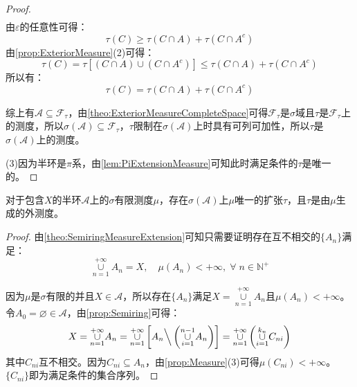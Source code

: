 \begin{proof}
\begin{align*}
	\end{align*}
	由$\varepsilon$的任意性可得：
	\begin{equation*}
		\tau(C)\geqslant\tau(C\cap A)+\tau(C\cap A^c)
	\end{equation*}
	由\cref{prop:ExteriorMeasure}(2)可得：
	\begin{equation*}
		\tau(C)=\tau[(C\cap A)\cup(C\cap A^c)]\leqslant\tau(C\cap A)+\tau(C\cap A^c)
	\end{equation*}
	所以有：
	\begin{equation*}
		\tau(C)=\tau(C\cap A)+\tau(C\cap A^c)
	\end{equation*}\par
	综上有$\mathscr{A}\subseteq\mathscr{F}_\tau$，由\cref{theo:ExteriorMeasureCompleteSpace}可得$\mathscr{F}_\tau$是$\sigma$域且$\tau$是$\mathscr{F}_\tau$上的测度，所以$\sigma(\mathscr{A})\subseteq\mathscr{F}_\tau$，$\tau$限制在$\sigma(\mathscr{A})$上时具有可列可加性，所以$\tau$是$\sigma(\mathscr{A})$上的测度。\par
	(3)因为半环是$\pi$系，由\cref{lem:PiExtensionMeasure}可知此时满足条件的$\tau$是唯一的。
\end{proof}
\begin{corollary}\label{cor:SemiringMeasureExtension}
	对于包含$X$的半环$\mathscr{A}$上的$\sigma$有限测度$\mu$，存在$\sigma(\mathscr{A})$上$\mu$唯一的扩张$\tau$，且$\tau$是由$\mu$生成的外测度。
\end{corollary}
\begin{proof}
	由\cref{theo:SemiringMeasureExtension}可知只需要证明存在互不相交的$\{A_n\}$满足：
	\begin{equation*}
		\underset{n=1}{\overset{+\infty}{\cup}}A_n=X,\quad\mu(A_n)<+\infty,\;\forall\;n\in\mathbb{N}^+
	\end{equation*}\par
	因为$\mu$是$\sigma$有限的并且$X\in\mathscr{A}$，所以存在$\{A_n\}$满足$X=\underset{n=1}{\overset{+\infty}{\cup}}A_n$且$\mu(A_n)<+\infty$。令$A_0=\varnothing\in\mathscr{A}$，由\cref{prop:Semiring}可得：
	\begin{equation*}
		X=\underset{n=1}{\overset{+\infty}{\cup}}A_n=\underset{n=1}{\overset{+\infty}{\cup}}\left[A_n\Big\backslash\left(\underset{i=1}{\overset{n-1}{\cup}}A_n\right)\right]=\underset{n=1}{\overset{+\infty}{\cup}}\left(\underset{i=1}{\overset{k_n}{\cup}}C_{ni}\right)
	\end{equation*}
	其中$C_{ni}$互不相交。因为$C_{ni}\subseteq A_n$，由\cref{prop:Measure}(3)可得$\mu(C_{ni})<+\infty$。$\{C_{ni}\}$即为满足条件的集合序列。
\end{proof}
